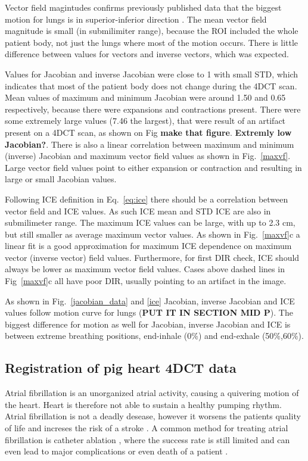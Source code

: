 \documentclass[type=dr, dr=rernat, accentcolor=tud7b,colorbacktitle, bigchapter, openright, twoside, 12pt ]{tudthesis}
\begin{document}
Vector field magintudes confirms previously published data that the biggest motion for lungs is in superior-inferior direction \cite{Seppenwoolde2002, Britton2007, Liu2007}. The mean vector field magnitude is small (in submilimiter range), 
because the ROI included the whole patient body, not just the lungs where most of the motion occurs. There is little difference between values for vectors and inverse vectors, which was expected.

Values for Jacobian and inverse Jacobian were close to 1 with small STD, which indicates that most of the patient body does not change during the 4DCT scan. Mean values of maximum and minimum Jacobian were around 1.50 and 0.65 respectively, because there were expansions and contractions present. There were some extremely large values (7.46 the largest), that were result of an artifact present on a 4DCT scan, as shown on Fig \textbf{make that figure}. \textbf{Extremly low Jacobian?}. There is also a linear correlation between maximum and minimum (inverse) Jacobian and maximum vector field values as shown in Fig.~\ref{maxvf}. Large vector field values point to either expansion or contraction and resulting in large or small Jacobian values.

Following ICE definition in Eq.~\ref{eq:ice} there should be a correlation between vector field and ICE values. As such ICE mean and STD ICE are also in submilimeter range. The maximum ICE values can be large, with up to 2.3 cm, but still smaller as average maximum vector values. As shown in Fig.~\ref{maxvf}c a linear fit is a good approximation for maximum ICE dependence on maximum vector (inverse vector) field values. Furthermore, for first DIR check, ICE should always be lower as maximum vector field values. Cases above dashed lines in Fig~\ref{maxvf}c all have poor DIR, usually pointing to an artifact in the image.

As shown in Fig.~\ref{jacobian_data} and \ref{ice} Jacobian, inverse Jacobian and ICE values follow motion curve for lungs (\textbf{PUT IT IN SECTION MID P}). The biggest difference for motion as well for Jacobian, inverse Jacobian and ICE is between extreme breathing positions, end-inhale (0\%) and end-exhale (50\%,60\%). 


\subsection{Registration of pig heart 4DCT data}

Atrial fibrillation is an unorganized atrial activity, causing a quivering motion of the heart. Heart is therefore not able to sustain a healthy pumping rhythm. Atrial fibrillation is not a
deadly desease, however it worsens the patients quality of life and increses the risk of a stroke \cite{Benjamin1998}. A common method for treating atrial fibrillation is catheter ablation \cite{January2014}, 
where the success rate is still limited and can even lead to major complications or even death of a patient \cite{Cappato2005,Cappato2010}.
\end{document}
